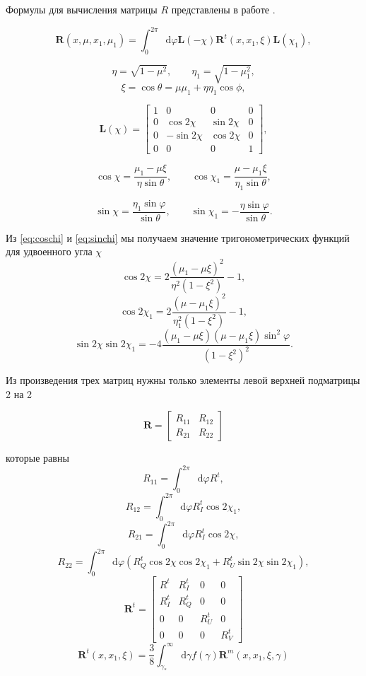 \documentclass[14pt,a4paper]{extarticle}
\newcommand{\be}{\begin{equation}}
\newcommand{\ee}{\end{equation}}
\newcommand*\df {\mathop{}\!\mathrm{d}}
\begin{document}
			Формулы для вычисления матрицы $R$ представлены в работе \cite{Nagirner1993}.

			\be
			\bm{R}(x,\mu,x_1,\mu_1)=\int_0^{2\pi}\df \varphi 
			\bm{L}(-\chi)
			\bm{R}^t(x,x_1,\xi)
			\bm{L}(\chi_1),
			\ee


			$$
			\eta=\sqrt{1-\mu^2}, \qquad \eta_1=\sqrt{1-\mu_1^2},
			$$
			\be
			\xi=\cos\theta=\mu \mu_1 + \eta \eta_1 \cos \phi,
			\ee

			\be
			\bm{L}(\chi)=
			\left[{\begin{array}{cccc}
			    1 & 0 & 0 & 0 \\
			    0 & \cos{2\chi} & \sin{2\chi} & 0 \\
			    0 & -\sin{2\chi} & \cos{2\chi} & 0 \\
			    0 & 0 & 0 & 1  
			   \end{array} } \right],
			\ee

			\be\label{eq:coschi}
			\cos\chi=\frac{\mu_1-\mu\xi}{\eta\sin\theta},
			\qquad
			\cos\chi_1=\frac{\mu-\mu_1\xi}{\eta_1\sin\theta},
			\ee

			\be
			\label{eq:sinchi}
			\sin\chi=\frac{\eta_1\sin\varphi}{\sin\theta},
			\qquad
			\sin\chi_1=-\frac{\eta\sin\varphi}{\sin\theta}.
			\ee

			Из \eqref{eq:coschi} и \eqref{eq:sinchi} мы получаем значение тригонометрических функций для удвоенного угла $\chi$ 
			\be
			\cos2\chi=2\frac{(\mu_1-\mu\xi)^2}{\eta^2(1-\xi^2)}-1,
			\ee
			\be
			\cos2\chi_1=2\frac{(\mu-\mu_1\xi)^2}{\eta_1^2(1-\xi^2)}-1,
			\ee
			\be
			\sin2\chi\sin2\chi_1=-
			4\frac{(\mu_1-\mu\xi)(\mu-\mu_1\xi)\sin^2\varphi}{(1-\xi^2)^2}.
			\ee

			Из произведения трех матриц нужны только элементы левой верхней подматрицы 2 на 2 
			
			\be
			\bm{R}=
			\left[ {\begin{array}{cc}
			    R_{11} & R_{12}  \\
			    R_{21} & R_{22}  
			    \end{array} } \right]
			\ee
			
			которые равны $$
			R_{11}=\int_0^{2\pi} \df \varphi R^t ,
			$$$$
			R_{12}=\int_0^{2\pi} \df \varphi R^t_I\cos2\chi_1 ,
			$$$$
			R_{21}=\int_0^{2\pi} \df \varphi R^t_I\cos2\chi ,
			$$$$
			R_{22}=\int_0^{2\pi} \df \varphi (R^t_Q\cos2\chi\cos2\chi_1 + R^t_U \sin2\chi\sin2\chi_1),
			$$
			\be
			\bm{R}^t= 
			\left[ {\begin{array}{cccc}
			    R^t & R^t_I & 0 & 0 \\
			     R^t_I &  R^t_Q & 0 & 0 \\
			    0 & 0 &  R^t_U & 0 \\
			    0 & 0 & 0 &  R^t_V  
			   \end{array} } \right]
			\ee
			\be
			\bm{R}^t(x,x_1,\xi)=\frac38\int_{\gamma_*}^\infty \df \gamma
			f(\gamma)\bm{R}^m(x,x_1,\xi,\gamma)
			\ee
\end{document}
